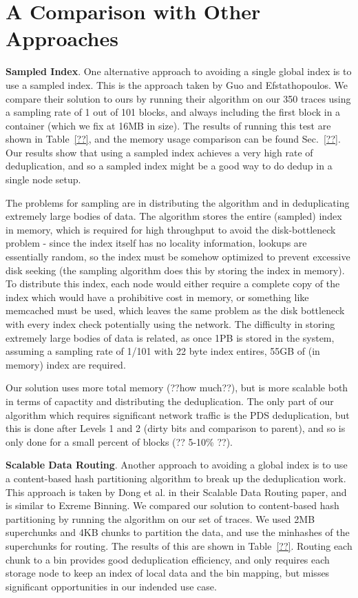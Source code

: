 \section{A Comparison  with Other Approaches}

{\bf Sampled Index}.
One alternative approach to avoiding a single global index is to use a sampled
index. This is the approach taken by Guo and Efstathopoulos\cite{Guo2011}. We
compare their solution to ours by running their algorithm on our 350 traces
using a sampling rate of 1 out of 101 blocks, and always including the first
block in a container (which we fix at 16MB in size). The results of running this
test are shown in Table~\ref{??}, and the memory usage comparison can be found
Sec.~\ref{??}. Our results show that using a sampled index achieves a very high
rate of deduplication, and so a sampled index might be a good way to do dedup
in a single node setup.

The problems for sampling are in distributing the
algorithm and in deduplicating extremely large bodies of data. The algorithm
stores the entire (sampled) index in memory, which is required for high
throughput to avoid the disk-bottleneck problem - since the index itself has no
locality information, lookups are essentially random, so the index must be
somehow optimized to prevent excessive disk seeking (the sampling algorithm does
this by storing the index in memory). To distribute this index, each node would
either require a complete copy of the index which would have a prohibitive cost in
memory, or something like memcached must be used, which leaves the same problem
as the disk bottleneck with every index check potentially using the network.
The difficulty in storing extremely large bodies of data
is related, as once 1PB is stored in the system, assuming a sampling rate of 
1/101 with 22 byte index entires, 55GB of (in memory) index are required.

Our solution uses more total memory (??how much??), but is more scalable both in
terms of capactity and distributing the deduplication. The only part of our
algorithm which requires significant network traffic is the PDS deduplication,
but this is done after Levels 1 and 2 (dirty bits and comparison to parent), and
so is only done for a small percent of blocks (?? 5-10\% ??).

{\bf Scalable Data Routing}.
Another approach to avoiding a global index is to use a content-based hash
partitioning algorithm to break up the deduplication work. This approach is
taken by Dong et al. in their Scalable Data Routing paper, and is similar to
Exreme Binning\cite{??}\cite{extreme_binning09}. We compared our solution to
content-based hash partitioning by running the algorithm on our set of 
traces. We used 2MB superchunks and 4KB chunks to partition the data, and use
the minhashes of the superchunks for routing. The results of this are shown in
Table~\ref{??}. Routing each chunk to a bin provides good deduplication
efficiency, and only requires each storage node to keep an index of local data
and the bin mapping, but misses significant opportunities in our indended use
case.

